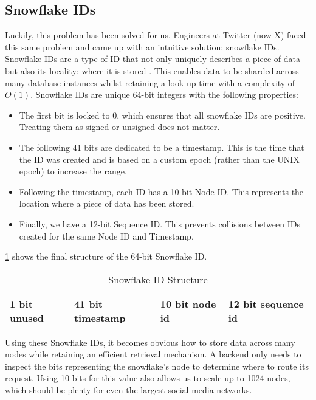 \subsection{Snowflake IDs} 
\label{sec:design-system-database-snowflake}
Luckily, this problem has been solved for us. Engineers at Twitter (now X) faced this same problem and came up with an intuitive solution: snowflake IDs. Snowflake IDs are a type of ID that not only uniquely describes a piece of data but also its locality: where it is stored \citep{2010snowflake}. This enables data to be sharded across many database instances whilst retaining a look-up time with a complexity of $O(1)$.
Snowflake IDs are unique 64-bit integers with the following properties:
\begin{itemize}
    \item The first bit is locked to 0, which ensures that all snowflake IDs are positive. Treating them as signed or unsigned does not matter.
    \item The following 41 bits are dedicated to be a timestamp. This is the time that the ID was created and is based on a custom epoch (rather than the UNIX epoch) to increase the range.
    \item Following the timestamp, each ID has a 10-bit Node ID. This represents the location where a piece of data has been stored.
    \item Finally, we have a 12-bit Sequence ID. This prevents collisions between IDs created for the same Node ID and Timestamp.
\end{itemize}
\ref{tab:snowflake} shows the final structure of the 64-bit Snowflake ID.

\begin{table}[htbp]
\centering
\begin{tabular}{|l|l|l|l|}
\hline
1 bit unused & 41 bit timestamp & 10 bit node id & 12 bit sequence id \\ \hline
\end{tabular}
\caption{Snowflake ID Structure}
\label{tab:snowflake}
\end{table}

Using these Snowflake IDs, it becomes obvious how to store data across many nodes while retaining an efficient retrieval mechanism. A backend only needs to inspect the bits representing the snowflake's node to determine where to route its request. Using 10 bits for this value also allows us to scale up to 1024 nodes, which should be plenty for even the largest social media networks.

